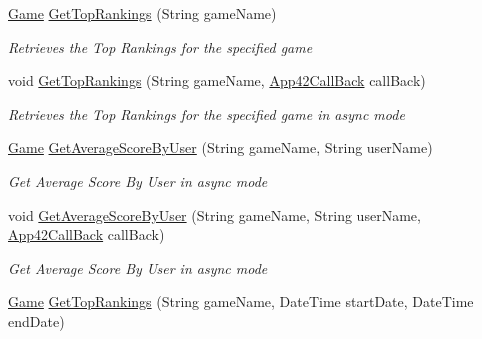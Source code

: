 \begin{DoxyCompactItemize}
\hyperlink{classcom_1_1shephertz_1_1app42_1_1paas_1_1sdk_1_1csharp_1_1game_1_1_game}{Game} \hyperlink{classcom_1_1shephertz_1_1app42_1_1paas_1_1sdk_1_1csharp_1_1game_1_1_score_board_service_a687e35921c33022391a866a126802474}{Get\+Top\+Rankings} (String game\+Name)
\begin{DoxyCompactList}\small\item\em Retrieves the Top Rankings for the specified game \end{DoxyCompactList}\item 
void \hyperlink{classcom_1_1shephertz_1_1app42_1_1paas_1_1sdk_1_1csharp_1_1game_1_1_score_board_service_a152e6f4cbaa5dca0aea19a055006ea28}{Get\+Top\+Rankings} (String game\+Name, \hyperlink{interfacecom_1_1shephertz_1_1app42_1_1paas_1_1sdk_1_1csharp_1_1_app42_call_back}{App42\+Call\+Back} call\+Back)
\begin{DoxyCompactList}\small\item\em Retrieves the Top Rankings for the specified game in async mode \end{DoxyCompactList}\item 
\hyperlink{classcom_1_1shephertz_1_1app42_1_1paas_1_1sdk_1_1csharp_1_1game_1_1_game}{Game} \hyperlink{classcom_1_1shephertz_1_1app42_1_1paas_1_1sdk_1_1csharp_1_1game_1_1_score_board_service_a280ceb7874be72ad342ed5066cb7f1b8}{Get\+Average\+Score\+By\+User} (String game\+Name, String user\+Name)
\begin{DoxyCompactList}\small\item\em Get Average Score By User in async mode \end{DoxyCompactList}\item 
void \hyperlink{classcom_1_1shephertz_1_1app42_1_1paas_1_1sdk_1_1csharp_1_1game_1_1_score_board_service_a0821aff5af246b3ec4188f859164ca4c}{Get\+Average\+Score\+By\+User} (String game\+Name, String user\+Name, \hyperlink{interfacecom_1_1shephertz_1_1app42_1_1paas_1_1sdk_1_1csharp_1_1_app42_call_back}{App42\+Call\+Back} call\+Back)
\begin{DoxyCompactList}\small\item\em Get Average Score By User in async mode \end{DoxyCompactList}\item 
\hyperlink{classcom_1_1shephertz_1_1app42_1_1paas_1_1sdk_1_1csharp_1_1game_1_1_game}{Game} \hyperlink{classcom_1_1shephertz_1_1app42_1_1paas_1_1sdk_1_1csharp_1_1game_1_1_score_board_service_a19479680be37391daf9484a4890cf9d7}{Get\+Top\+Rankings} (String game\+Name, Date\+Time start\+Date, Date\+Time end\+Date)

\end{DoxyCompactItemize}
